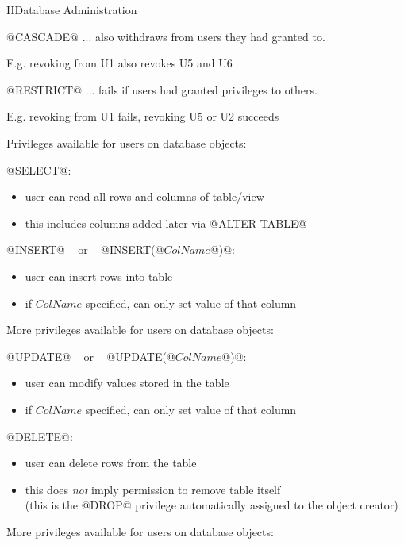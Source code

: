 \begin{lecture}{H}{Database Administration}
\begin{slide}
@CASCADE@ ... also withdraws from users they had granted to.

E.g. revoking from U1 also revokes U5 and U6

@RESTRICT@ ... fails if users had granted privileges to others.

E.g. revoking from U1 fails, revoking U5 or U2 succeeds
\end{slide}

\begin{slide}
Privileges available for users on database objects:

@SELECT@:
\begin{itemize}
\item user can read all rows and columns of table/view
\item this includes columns added later via @ALTER TABLE@
\end{itemize}
@INSERT@ ~ or ~ @INSERT(@$ColName$@)@:
\begin{itemize}
\item user can insert rows into table
\item if $ColName$ specified, can only set value of that column
\end{itemize}
\end{slide}

\begin{slide}
More privileges available for users on database objects:

@UPDATE@ ~ or ~ @UPDATE(@$ColName$@)@:
\begin{itemize}
\item user can modify values stored in the table
\item if $ColName$ specified, can only set value of that column
\end{itemize}
@DELETE@:
\begin{itemize}
\item user can delete rows from the table
\item this does {\it{not}} imply permission to remove table itself \\
	{\small (this is the @DROP@ privilege automatically assigned to the object creator)}
\end{itemize}
\end{slide}

\begin{slide}
More privileges available for users on database objects:


\end{slide}
\end{lecture}
